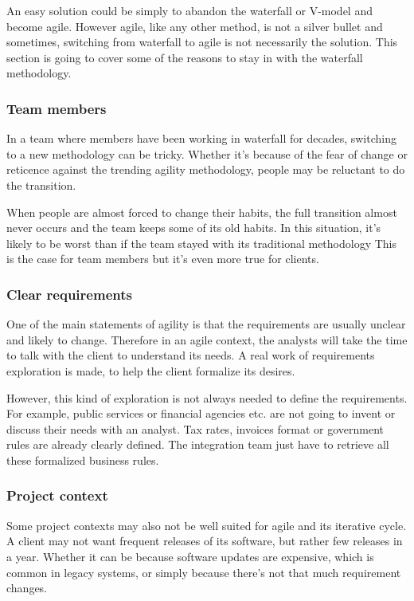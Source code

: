 An easy solution could be simply to abandon the waterfall or V-model and become
agile.
However agile, like any other method, is not a silver bullet and sometimes,
switching from waterfall to agile is not necessarily the solution.
This section is going to cover some of the reasons to stay in with the
waterfall methodology.

\subsubsection{Team members}
In a team where members have been working in waterfall for decades, switching
to a new methodology can be tricky.
Whether it's because of the fear of change or reticence against the
trending agility methodology, people may be reluctant to do the transition.

When people are almost forced to change their habits, the full transition
almost never occurs and the team keeps some of its old habits.
In this situation, it's likely to be worst than if the team stayed with its
traditional methodology
This is the case for team members but it's even more true for clients.

\subsubsection{Clear requirements}
One of the main statements of agility is that the requirements are usually
unclear and likely to change.
Therefore in an agile context, the analysts will take the time to talk with
the client to understand its needs.
A real work of requirements exploration is made, to help the client
formalize its desires.

However, this kind of exploration is not always needed to define the
requirements.
For example, public services or financial agencies etc.
are not going to invent or discuss their needs with an analyst.
Tax rates, invoices format or government rules are already clearly defined.
The integration team just have to retrieve all these formalized business rules.

\subsubsection{Project context}
Some project contexts may also not be well suited for agile and its iterative
cycle.
A client may not want frequent releases of its software, but rather few
releases in a year.
Whether it can be because software updates are expensive, which is common in
legacy systems, or simply because there's not that much requirement changes.

